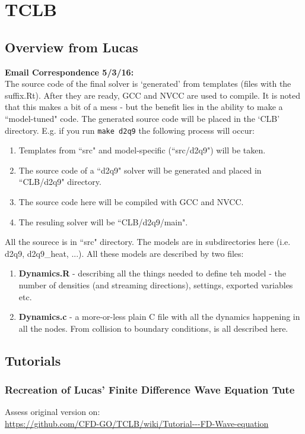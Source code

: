 \documentclass[12pt,a4paper]{report}
\begin{document}
\tableofcontents

\chapter{TCLB}
\section{Overview from Lucas}
\textbf{Email Correspondence 5/3/16:}\\
The source code of the final solver is `generated' from templates (files with the suffix.Rt). After they are ready, GCC and NVCC are used to compile. It is noted that this makes a bit of a mess - but the benefit lies in the ability to make a ``model-tuned" code. The generated source code will be placed in the `CLB' directory. E.g. if you run \lstinline$make d2q9$ the following process will occur:
\begin{enumerate}
\item Templates from ``src" and model-specific (``src/d2q9") will be taken.
\item The source code of a ``d2q9" solver will be generated and placed in ``CLB/d2q9" directory.
\item The source code here will be compiled with GCC and NVCC.
\item The resuling solver will be ``CLB/d2q9/main".
\end{enumerate}
All the sourece is in ``src" directory. The models are in subdirectories here (i.e. d2q9, d2q9\_heat, ...). All these models are described by two files:
\begin{enumerate}
\item \textbf{Dynamics.R} - describing all the things needed to define teh model - the number of densities (and streaming directions), settings, exported variables etc.
\item \textbf{Dynamics.c} - a more-or-less plain C file with all the dynamics happening in all the nodes. From collision to boundary conditions, is all described here.
\end{enumerate}

\newpage
\section{Tutorials}
\subsection{Recreation of Lucas' Finite Difference Wave Equation Tute}
Assess original version on:\\ \url{https://github.com/CFD-GO/TCLB/wiki/Tutorial---FD-Wave-equation}
\end{document}
